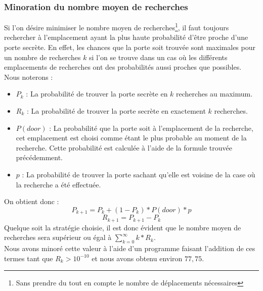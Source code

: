 \documentclass[a4paper,12pt]{article}
\begin{document}
\subsubsection{Minoration du nombre moyen de recherches}
Si l'on désire minimiser le nombre moyen de recherches\footnote{Sans prendre du
  tout en compte le nombre de déplacements nécessaires}, il faut toujours
rechercher à l'emplacement ayant la plus haute probabilité d'être proche d'une
porte secrète. En effet, les chances que la porte soit trouvée sont maximales
pour un nombre de recherches $k$ si l'on se trouve dans un cas où les différents
emplacements de recherches ont des probabilités aussi proches que possibles.
\\
Nous noterons :
\begin{itemize}
\item $P_k$ : La probabilité de trouver la porte secrète en $k$ recherches au
  maximum.
\item $R_k$ : La probabilité de trouver la porte secrète en exactement $k$
  recherches.
\item $P(door)$ : La probabilité que la porte soit à l'emplacement de la
  recherche, cet emplacement est choisi comme étant le plus probable au moment
  de la recherche. Cette probabilité est calculée à l'aide de la formule trouvée
  précédemment.
\item $p$ : La probabilité de trouver la porte sachant qu'elle est voisine de la
  case où la recherche a été effectuée.
\end{itemize}
On obtient donc :
$$P_{k+1} = P_k + (1 - P_k) * P(door) * p$$
$$R_{k+1} = P_{k+1} - P_{k}$$
Quelque soit la stratégie choisie, il est donc évident que le nombre moyen de
recherches sera supérieur ou égal à $\sum\limits_{k=0}^{\infty} k * R_k$.
\\
Nous avons minoré cette valeur à l'aide d'un programme faisant l'addition de ces
termes tant que $R_k > 10^{-10}$ et nous avons obtenu environ $77,75$.
\end{document}
